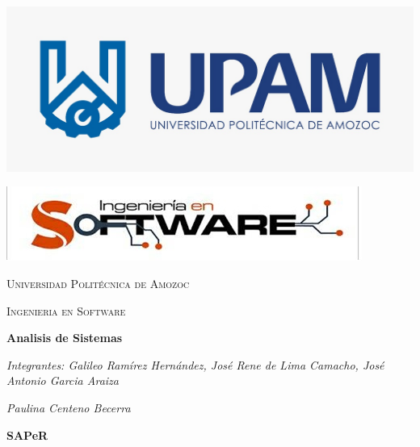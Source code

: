 \documentclass[10pt,a4paper]{report}
\author{Jose Antonio Garcia Araiza}
\begin{document}
\begin{titlepage}
   \centering
      \includegraphics[scale=0.25]{11.jpg} \par\vspace{1cm}
      \includegraphics[scale=0.75]{logos.jpg} \par\vspace{1cm}
   
  	  {\scshape\LARGE Universidad Politécnica de Amozoc\\ \par}
      \vspace{1cm}
 
      {\scshape\large Ingenieria en Software\\ \par}
      \vspace{1cm}
    

   
  		 {\huge\bfseries Analisis de Sistemas\par}
   		 \vspace{2cm}
   		 {\Large\itshape Integrantes: Galileo Ramírez Hernández, José Rene de Lima Camacho, José Antonio Garcia Araiza\par}
         \vspace{1cm}
   		 {\Large\itshape Paulina Centeno Becerra}
         \vfill
         {\Large\bfseries SAPeR\par}
         \vfill
 
\end{titlepage}
\end{document}
